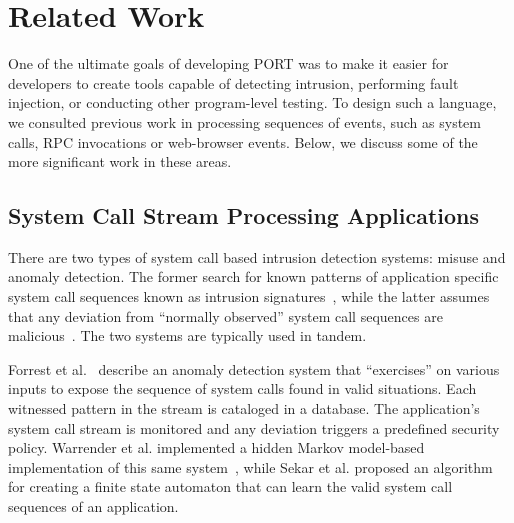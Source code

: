 \section{Related Work}
\label{SEC:related-work}

One of the ultimate goals of developing PORT
was to make it easier for developers to
create tools capable of detecting intrusion,
performing fault injection,
or conducting other program-level testing.
To design such a language,
we consulted
previous work
in processing sequences of events, such as
system calls, RPC invocations or
web-browser events.
Below, we discuss some of the more significant work in these areas.

\subsection{System Call Stream Processing Applications}

There are two types of system call based intrusion detection systems: misuse and anomaly detection.
The former search for known patterns of application specific
system call
sequences known as intrusion signatures~\cite{GARCIATEODORO200918}, while
the latter assumes that
any deviation
from ``normally observed'' system call sequences are 
malicious~\cite{DBLP:conf/sp/ForrestHSL96}.
The two systems are typically used in tandem. 

Forrest et al.~\cite{DBLP:conf/sp/ForrestHSL96} describe
an anomaly detection system that
``exercises'' on various inputs to expose the
sequence of system calls found in valid situations.
Each witnessed pattern in the stream
is cataloged in a database.
The application's system call stream
is monitored and any
deviation triggers a
predefined security policy.
Warrender et al. implemented a hidden Markov model-based implementation of this same system~\cite{DBLP:conf/sp/WarrenderFP99},
while
Sekar et al.\cite{DBLP:conf/sp/SekarBDB01} proposed
an algorithm
for creating a finite state automaton that can learn the valid system
call sequences of an application.


